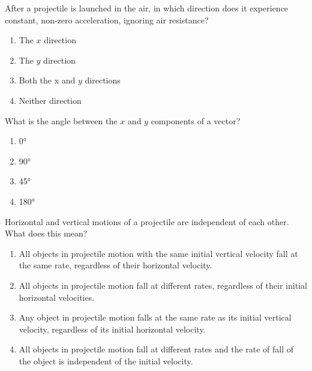\documentclass[main-physics.tex]{subfiles}
\begin{document}
\begin{exercise} \label{sy5RGT}
    After a projectile is launched in the air, in which direction does it experience constant, non-zero acceleration, ignoring air resistance?

    \begin{enumerate}[label=\Alph*.]
        \item The $x$ direction
        \item The $y$ direction
        \item Both the x and $y$ directions
        \item Neither direction
    \end{enumerate}
\end{exercise}

\begin{exercise} \label{90PABl}
    What is the angle between the $x$ and $y$ components of a vector?

    \begin{enumerate}[label=\Alph*.]
        \item \ang{0}
        \item \ang{90}
        \item \ang{45}
        \item \ang{180}
    \end{enumerate}
\end{exercise}

\begin{exercise} \label{8I1QP6}
    Horizontal and vertical motions of a projectile are independent of each other. What does this mean?

\begin{enumerate}[label=\Alph*.]
    \item All objects in projectile motion with the same initial vertical velocity fall at the same rate, regardless of their horizontal velocity.
    \item All objects in projectile motion fall at different rates, regardless of their initial horizontal velocities.
    \item Any object in projectile motion falls at the same rate as its initial vertical velocity, regardless of its initial horizontal velocity.
    \item All objects in projectile motion fall at different rates and the rate of fall of the object is independent of the initial velocity.
\end{enumerate}
\end{exercise}
\end{document}
